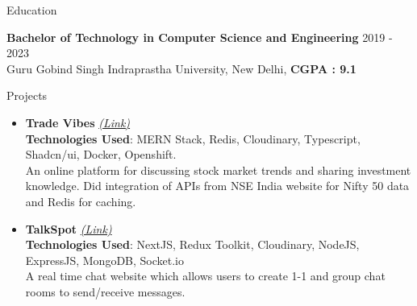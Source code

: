 \documentclass{resume} %
\begin{document}
\begin{rSection}{Education}

{\bf Bachelor of Technology in Computer Science and Engineering} \hfill {2019 - 2023}
\\ 
{\normalfont Guru Gobind Singh Indraprastha University, New Delhi}, \textbf{CGPA : 9.1}

\end{rSection}
 


\begin{rSection}{Projects}
   \begin{itemize}
    \item \textbf{Trade Vibes} 
    \href{https://github.com/tushargahlaut/TradeVibes}
    {\emph{(Link)}}
    \\ \textbf{Technologies Used}: MERN Stack, Redis, Cloudinary, Typescript, Shadcn/ui, Docker, Openshift.
     \\An online platform for discussing stock market trends and sharing investment knowledge. Did integration of APIs from NSE India website for Nifty 50 data and Redis for caching.
    \item \textbf{TalkSpot} 
   \href{https://github.com/tushargahlaut/talkspot-chat-app}{\emph{(Link)}} 
   \\ \textbf{Technologies Used}: NextJS, Redux Toolkit, Cloudinary, NodeJS, ExpressJS, MongoDB, Socket.io 
   \\{\normalfont A real time chat website which allows users to create 1-1 and group chat rooms to send/receive messages.}
   
   \end{itemize}
\end{rSection}
\end{document}
